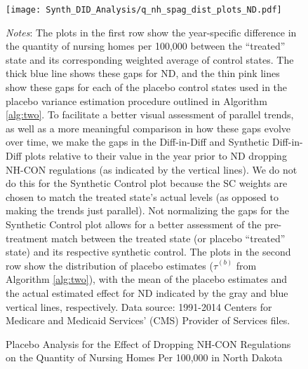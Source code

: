 \documentclass[../Main.tex]{subfiles}
\begin{document}
\newpage
\begin{figure}[t]
	\begin{center}
	\caption{\label{fig: q_nh_spag_plots_nd} \centering Placebo Analysis for the Effect of Dropping NH-CON Regulations on the Quantity of Nursing Homes Per 100,000 in North Dakota}
    \texttt{[image: Synth\_DID\_Analysis/q\_nh\_spag\_dist\_plots\_ND.pdf]}
    \end{center}
    \footnotesize
		\textit{Notes}: The plots in the first row show the year-specific difference in the quantity of nursing homes per 100,000 between the ``treated'' state and its corresponding weighted average of control states. The thick blue line shows these gaps for ND, and the thin pink lines show these gaps for each of the placebo control states used in the placebo variance estimation procedure outlined in Algorithm \ref{alg:two}. To facilitate a better visual assessment of parallel trends, as well as a more meaningful comparison in how these gaps evolve over time, we make the gaps in the Diff-in-Diff and Synthetic Diff-in-Diff plots relative to their value in the year prior to ND dropping NH-CON regulations (as indicated by the vertical lines). We do not do this for the Synthetic Control plot because the SC weights are chosen to match the treated state's actual levels (as opposed to making the trends just parallel). Not normalizing the gaps for the Synthetic Control plot allows for a better assessment of the pre-treatment match between the treated state (or placebo ``treated'' state) and its respective synthetic control. The plots in the second row show the distribution of placebo estimates ($\hat{\tau}^{(b)}$ from Algorithm \ref{alg:two}), with the mean of the placebo estimates and the actual estimated effect for ND indicated by the gray and blue vertical lines, respectively. Data source: 1991-2014 Centers for Medicare and Medicaid Services’ (CMS) Provider of Services files.
\end{figure}
\clearpage


\end{document}
